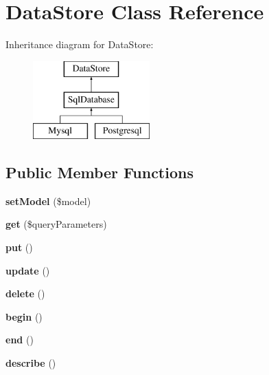 \hypertarget{class_data_store}{
\section{DataStore Class Reference}
\label{class_data_store}
}
Inheritance diagram for DataStore:\begin{figure}[H]
\begin{center}
\leavevmode
\includegraphics[height=3.000000cm]{class_data_store}
\end{center}
\end{figure}
\subsection*{Public Member Functions}
\begin{DoxyCompactItemize}
\item 
\hypertarget{class_data_store_a003b4eab341ac67a4fb48072454c7b9d}{
{\bfseries setModel} (\$model)}
\label{class_data_store_a003b4eab341ac67a4fb48072454c7b9d}

\item 
\hypertarget{class_data_store_aa43bd201896248f7bce951fe380a0142}{
{\bfseries get} (\$queryParameters)}
\label{class_data_store_aa43bd201896248f7bce951fe380a0142}

\item 
\hypertarget{class_data_store_a802c1e85f22cdce3545946dd8e34cb36}{
{\bfseries put} ()}
\label{class_data_store_a802c1e85f22cdce3545946dd8e34cb36}

\item 
\hypertarget{class_data_store_af1ce7c5aee131d7f8da04017402341a1}{
{\bfseries update} ()}
\label{class_data_store_af1ce7c5aee131d7f8da04017402341a1}

\item 
\hypertarget{class_data_store_a854c55ceb7dce8e464a5f148818184d5}{
{\bfseries delete} ()}
\label{class_data_store_a854c55ceb7dce8e464a5f148818184d5}

\item 
\hypertarget{class_data_store_ae1aafd885ecd6fb54d35c007964d4d76}{
{\bfseries begin} ()}
\label{class_data_store_ae1aafd885ecd6fb54d35c007964d4d76}

\item 
\hypertarget{class_data_store_a9c2118f84d4748e0bd176a37c201b4c1}{
{\bfseries end} ()}
\label{class_data_store_a9c2118f84d4748e0bd176a37c201b4c1}

\item 
\hypertarget{class_data_store_a5bbdbbfe7823bc17f6ae968e7b3d0755}{
{\bfseries describe} ()}
\label{class_data_store_a5bbdbbfe7823bc17f6ae968e7b3d0755}

\end{DoxyCompactItemize}
